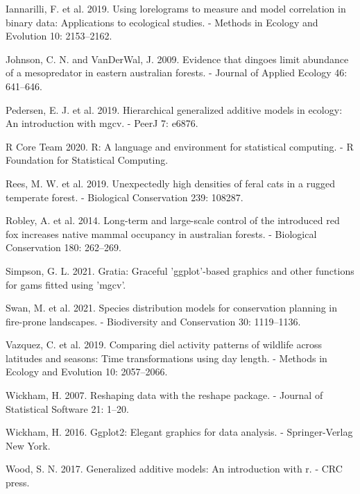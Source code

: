 \documentclass[]{elsarticle} %
\begin{document}
\leavevmode\hypertarget{ref-https:ux2fux2fdoi.orgux2f10.1111ux2f2041-210X.13308}{}%
Iannarilli, F. et al. 2019. Using lorelograms to measure and model correlation in binary data: Applications to ecological studies. - Methods in Ecology and Evolution 10: 2153--2162.

\leavevmode\hypertarget{ref-https:ux2fux2fdoi.orgux2f10.1111ux2fj.1365-2664.2009.01650.x}{}%
Johnson, C. N. and VanDerWal, J. 2009. Evidence that dingoes limit abundance of a mesopredator in eastern australian forests. - Journal of Applied Ecology 46: 641--646.

\leavevmode\hypertarget{ref-pedersen2019hierarchical}{}%
Pedersen, E. J. et al. 2019. Hierarchical generalized additive models in ecology: An introduction with mgcv. - PeerJ 7: e6876.

\leavevmode\hypertarget{ref-R}{}%
R Core Team 2020. R: A language and environment for statistical computing. - R Foundation for Statistical Computing.

\leavevmode\hypertarget{ref-REES2019108287}{}%
Rees, M. W. et al. 2019. Unexpectedly high densities of feral cats in a rugged temperate forest. - Biological Conservation 239: 108287.

\leavevmode\hypertarget{ref-ROBLEY2014262}{}%
Robley, A. et al. 2014. Long-term and large-scale control of the introduced red fox increases native mammal occupancy in australian forests. - Biological Conservation 180: 262--269.

\leavevmode\hypertarget{ref-gratia}{}%
Simpson, G. L. 2021. Gratia: Graceful 'ggplot'-based graphics and other functions for gams fitted using 'mgcv'.

\leavevmode\hypertarget{ref-swan2021species}{}%
Swan, M. et al. 2021. Species distribution models for conservation planning in fire-prone landscapes. - Biodiversity and Conservation 30: 1119--1136.

\leavevmode\hypertarget{ref-https:ux2fux2fdoi.orgux2f10.1111ux2f2041-210X.13290}{}%
Vazquez, C. et al. 2019. Comparing diel activity patterns of wildlife across latitudes and seasons: Time transformations using day length. - Methods in Ecology and Evolution 10: 2057--2066.

\leavevmode\hypertarget{ref-reshape}{}%
Wickham, H. 2007. Reshaping data with the reshape package. - Journal of Statistical Software 21: 1--20.

\leavevmode\hypertarget{ref-ggplot2}{}%
Wickham, H. 2016. Ggplot2: Elegant graphics for data analysis. - Springer-Verlag New York.

\leavevmode\hypertarget{ref-wood2017}{}%
Wood, S. N. 2017. Generalized additive models: An introduction with r. - CRC press.
\end{document}
